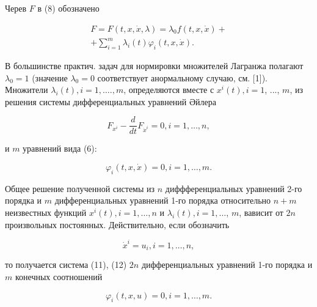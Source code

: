 \documentclass[10pt]{article}
\begin{document}
Черев $F$ в (8) обозначено



\[

\begin{gathered}

F=F(t, x, \dot{x}, \lambda)=\lambda_{0} f(t, x, \dot{x})+ \\

+\sum_{i=1}^{m} \lambda_{i}(t) \varphi_{i}(t, x, \dot{x}) .

\end{gathered}

\]



В большинстве практич. задач для нормировки множителей Лагранжа полагают $\lambda_{0}=1$ (значение $\lambda_{0}=0$ соответствует анормальному случаю, см. [1]). Множители $\lambda_{i}(t), i=1, \ldots ., m$, определяются вместе с $x^{i}(t), i=1$, ..., $m$, из решения системы дифференциальных уравнений Әйлера



\[

F_{x^{i}}-\frac{d}{d t} F_{\dot{x}^{i}}=0, i=1, \ldots, n,

\]



и $m$ уравнений вида (6):



\[

\varphi_{i}(t, x, \dot{x})=0, i=1, \ldots, m .

\]



Общее решение полученной системы из $n$ диффференциальных уравнений 2-го порядка и $m$ дифференциальных уравнений 1-го порядка относительно $n+m$ неизвестных функций $x^{i}(t), i=1, \ldots, n$ и $\lambda_{i}(t), i=1, \ldots$, $m$, вависит от $2 n$ произвольных постоянных. Действительно, если обозначить



\[

\dot{x}^{i}=u_{i}, i=1, \ldots, n,

\]



то получается система (11), (12) $2 n$ дифференциальных уравнений 1-го порядка и $m$ конечных соотношений



\[

\varphi_{i}(t, x, u)=0, i=1, \ldots, m .

\]
\end{document}
